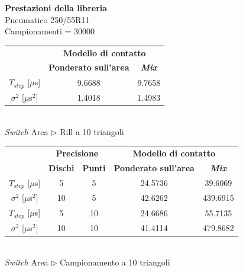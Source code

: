 \documentclass[xcolor=dvipsnames]{beamer} %
\begin{document}
\begin{frame}
	\Large {\textbf{Prestazioni della libreria}}\\
	\normalsize
	Pneumatico 250/55R11\\
	Campionamenti = 30000
	\begin{table}
		\centering
		\begin{tabular}{c|c|c|}
			\cline{2-3} 
			& \multicolumn{2}{c|}{\textbf{Modello di contatto}} \\
			\cline{2-3} 
			& \textbf{Ponderato sull'area} & \textbf{\textit{Mix}} \\ 
			\hline
			\multicolumn{1}{|c|}{$T_{step}$ [$\mu$s]} & 9.6688 & 9.7658 \\ 
			\hline 
			\multicolumn{1}{|c|}{$\sigma^2$ [$\mu$s$^2$]} & 1.4018 & 1.4983 \\ 
			\hline
		\end{tabular}
		\\[0.1cm]
		\textit{Switch} Area $\triangleright$ Rill a 10 triangoli
	\end{table}
	\begin{table}
		\centering
		\begin{tabular}{c|c|c|c|c|}
			\cline{2-5} 
			& \multicolumn{2}{c|}{\textbf{Precisione}} &\multicolumn{2}{c|}{\textbf{Modello di contatto}} \\
			\cline{2-5} 
			& \textbf{Dischi} & \textbf{Punti} & \textbf{Ponderato sull'area} & \textbf{\textit{Mix}} \\ 
			\hline
			\multicolumn{1}{|c|}{$T_{step}$ [$\mu$s]} & 5 & 5 & 24.5736 & 39.6069 \\ 
			\hline 
			\multicolumn{1}{|c|}{$\sigma^2$ [$\mu$s$^2$]} & 10 & 5 & 42.6262 & 439.6915 \\ 
			\hline
			
			\multicolumn{1}{|c|}{$T_{step}$ [$\mu$s]} & 5 & 10 & 24.6686 & 55.7135 \\ 
			\hline 
			\multicolumn{1}{|c|}{$\sigma^2$ [$\mu$s$^2$]} & 10 & 10 & 41.4114 & 479.8682 \\ 
			\hline
		\end{tabular}
		\\[0.1cm]
		\textit{Switch} Area $\triangleright$ Campionamento a 10 triangoli
	\end{table}
\end{frame}
\end{document}

